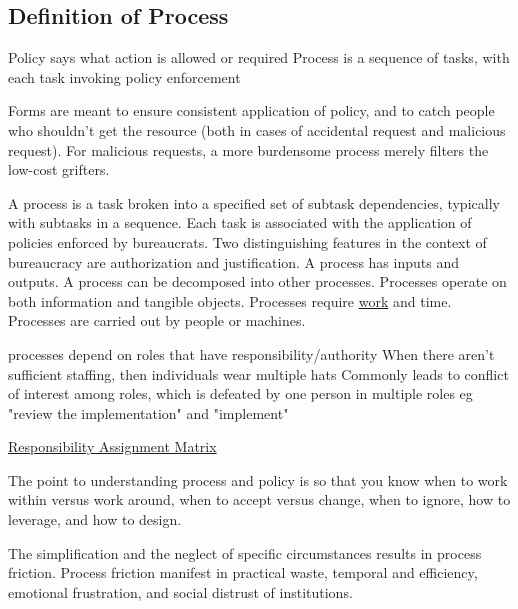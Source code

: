 \subsection{Definition of Process}

Policy says what action is allowed or required
Process is a sequence of tasks, with each task invoking policy enforcement 


Forms are meant to ensure consistent application of policy, and to catch people who shouldn't get the resource (both in cases of accidental request and malicious request). For malicious requests, a more burdensome process merely filters the low-cost grifters. 



A \gls{process} is a task broken into a specified set of subtask dependencies, typically with subtasks in a sequence. 
Each task is associated with the application of policies enforced by bureaucrats. 
Two distinguishing features in the context of bureaucracy are authorization and justification.  
A process has inputs and outputs. 
A process can be decomposed into other processes. 
Processes operate on both information and tangible objects. 
Processes require \href{https://en.wikipedia.org/wiki/Work_(physics)}{work} and time. 
Processes are carried out by people or machines.

processes depend on roles that have responsibility/authority
When there aren't sufficient staffing, then individuals wear multiple hats
Commonly leads to conflict of interest among roles, which is defeated by one person in multiple roles
eg "review the implementation" and "implement"

\href{https://en.wikipedia.org/wiki/Responsibility_assignment_matrix}{Responsibility Assignment Matrix}

The point to understanding process and policy is so that you know when to work within versus work around, when to accept versus change, when to ignore, how to leverage, and how to design.



The simplification and the neglect of specific circumstances results in process friction. Process friction manifest in practical waste, temporal and efficiency, emotional frustration, and social distrust of institutions.




